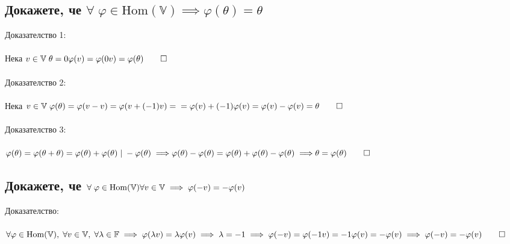 \documentclass{article}
\newcommand{\V}{\mathbb{V}}
\newcommand{\F}{\mathbb{F}}
\newcommand{\OV}{\theta}
\begin{document}
    \subsection{Докажете, че \(\forall \; \varphi \in \mathrm{Hom}(\V) \implies \varphi(\OV) = \OV\)}
    Доказателство 1: \\\\
    Нека \(v \in \V \; \OV = 0\varphi(v) = \varphi(0v) = \varphi(\OV) \qed \) \\\\
    Доказателство 2: \\\\
    Нека \(v \in \V \; \varphi(\OV) = \varphi(v - v) = \varphi(v + (-1)v) = \\\\
    = \varphi(v) + (-1)\varphi(v) = \varphi(v) - \varphi(v) = \OV \qed \) \\\\
    Доказателство 3: \\\\
    \(\varphi(\OV) = \varphi(\OV + \OV) = \varphi(\OV) + \varphi(\OV) \; | \; -\varphi(\OV) \implies \\\\
    \varphi(\OV) - \varphi(\OV) = \varphi(\OV) + \varphi(\OV) - \varphi(\OV) \implies \\\\
    \OV = \varphi(\OV) \qed \)
    \subsection{Докажете, че \(\forall \; \varphi \in \mathrm{Hom}(\V) \\
    \forall v \in \V \implies \varphi(-v) = -\varphi(v)\)}
    Доказателство: \\\\
    \(\forall \varphi \in \mathrm{Hom}(\V), \; \forall v \in \V, \; \forall \lambda \in \F \implies \varphi(\lambda v) = \lambda \varphi(v) \\\\
    \implies \lambda = -1 \implies \varphi(-v) = \varphi(-1v) = -1\varphi(v) = -\varphi(v) \\\\
    \implies \varphi(-v) = -\varphi(v) \qed\)
\end{document}
